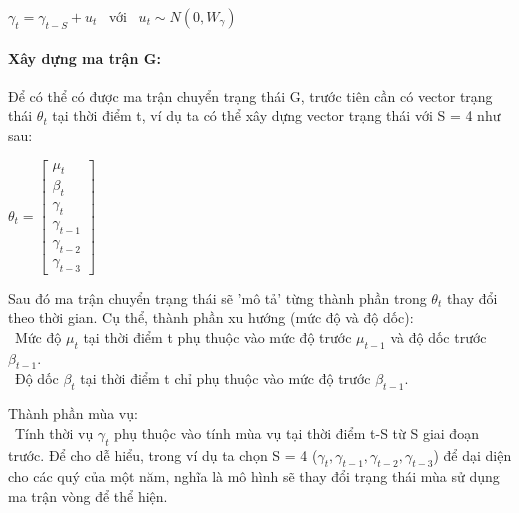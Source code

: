 \documentclass[conference]{IEEEtran}
\begin{document}
\begin{center}
    \(\gamma_{t} = \gamma_{t-S} + u_{t}\) \ với \ \(u_{t}\sim N(0,W_{\gamma})\)
\end{center}
\paragraph{Xây dựng ma trận G:}
Để có thể có được ma trận chuyển trạng thái G, trước tiên cần có vector trạng thái \(\theta_{t}\) tại thời điểm t, ví dụ ta có thể xây dựng vector trạng thái với S = 4 như sau:
\begin{center}
    \(\theta_{t} = \begin{bmatrix}
        \mu_{t} \\ \beta_{t}
        \\ \gamma_{t}
        \\ \gamma_{t-1}
        \\ \gamma_{t-2}
        \\ \gamma_{t-3}
    \end{bmatrix}\)
\end{center}
Sau đó ma trận chuyển trạng thái sẽ 'mô tả' từng thành phần trong \(\theta_{t}\) thay đổi theo thời gian. Cụ thể, thành phần xu hướng (mức độ và độ dốc):\\
\indent\textbullet\ Mức độ \(\mu_{t}\) tại thời điểm t phụ thuộc vào mức độ trước \(\mu_{t-1}\) và độ dốc trước \(\beta_{t-1}\).\\
\indent\textbullet\ Độ dốc \(\beta_{t}\) tại thời điểm t chỉ phụ thuộc vào mức độ trước \(\beta_{t-1}\).

Thành phần mùa vụ:\\
\indent\textbullet\ Tính thời vụ \(\gamma_{t}\) phụ thuộc vào tính mùa vụ tại thời điểm t-S từ S giai đoạn trước. Để cho dễ hiểu, trong ví dụ ta chọn S = 4 (\(\gamma_{t}, \gamma_{t-1}, \gamma_{t-2}, \gamma_{t-3}\)) để dại diện cho các quý của một năm, nghĩa là mô hình sẽ thay đổi trạng thái mùa sử dụng ma trận vòng để thể hiện.
\end{document}
